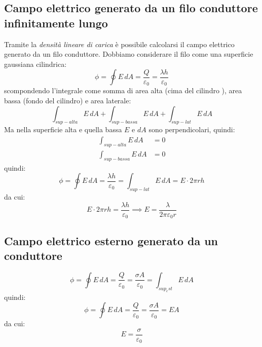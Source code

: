             \subsection{Campo elettrico generato da un filo conduttore 
            infinitamente lungo} Tramite la \textit{densità lineare di carica}
            è possibile calcolarsi il campo elettrico generato da un filo 
            conduttore. Dobbiamo considerare il filo come una superficie 
            gaussiana cilindrica:
                \begin{equation}
                    \phi = \oint E \, dA = \frac{Q}{\varepsilon_0} = 
                    \frac{\lambda h}{\varepsilon_0}
                \end{equation}
            scompondendo l'integrale come somma di area alta (cima del cilindro
            ), area bassa (fondo del cilindro) e area laterale:
                \begin{equation*}
                    \int_{sup-alta} E \, dA + \int_{sup-bassa} E \, dA
                    + \int_{sup-lat} E \, dA
                \end{equation*}
            Ma nella superficie alta e quella bassa $E$ e $dA$ sono 
            perpendicolari, quindi:
                \begin{align*}
                    \int_{sup-alta} E \, dA &= 0 \\
                    \int_{sup-bassa} E \, dA &= 0
                \end{align*}
            quindi:
                \begin{equation*}
                    \phi = \oint E \, dA = \frac{\lambda h}{\varepsilon_0}
                    = \int_{sup-lat} E \, dA = E \cdot 2\pi rh
                \end{equation*}
            da cui:
                \begin{equation}
                    E \cdot 2\pi rh = \frac{\lambda h}{\varepsilon_0}
                    \implies
                    E = \frac{\lambda}{2\pi\varepsilon_0r}
                \end{equation}

            \subsection{Campo elettrico esterno generato da un conduttore}
                \begin{equation*}
                    \phi = \oint E \, dA = \frac{Q}{\varepsilon_0} = 
                    \frac{\sigma A}{\varepsilon_0} = \int_{sup_est} E \, dA
                \end{equation*}
            quindi:
                \begin{equation*}
                    \phi = \oint E \, dA = \frac{Q}{\varepsilon_0} = 
                    \frac{\sigma A}{\varepsilon_0} = EA
                \end{equation*}
            da cui:
                \begin{equation}
                    E = \frac{\sigma}{\varepsilon_0}
                \end{equation}


